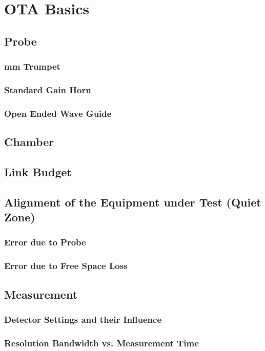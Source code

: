 \chapter{OTA Basics}

\section{Probe}

\subsection{mm Trumpet}

\subsection{Standard Gain Horn}

\subsection{Open Ended Wave Guide}

\section{Chamber}

\section{Link Budget}

\section{Alignment of the Equipment under Test (Quiet Zone)}

\subsection{Error due to Probe}

\subsection{Error due to Free Space Loss}

\section{Measurement}

\subsection{Detector Settings and their Influence}

\subsection{Resolution Bandwidth vs. Measurement Time}

\cite{funsspec}

